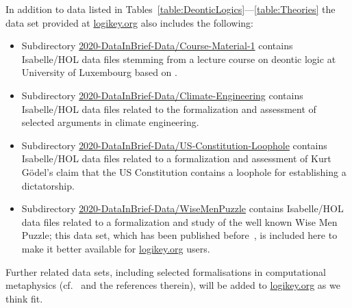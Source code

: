\documentclass{article}
\begin{document}
In addition to data listed in
Tables~\ref{table:DeonticLogics}---\ref{table:Theories} the data set
provided at \url{logikey.org} also includes the following:
\begin{itemize}
\item Subdirectory \url{2020-DataInBrief-Data/Course-Material-1} contains Isabelle/HOL data files stemming from a
  lecture course on deontic logic at University of Luxembourg based on \cite{textbook18}.
\item Subdirectory \url{2020-DataInBrief-Data/Climate-Engineering} contains Isabelle/HOL data files related to the
  formalization and assessment  \cite{C82}  of selected arguments in climate engineering.
\item  Subdirectory \url{2020-DataInBrief-Data/US-Constitution-Loophole} contains Isabelle/HOL data files related to a 
  formalization and assessment  \cite{zahoransky19} of Kurt G\"odel's claim that the US Constitution contains a
  loophole for establishing a dictatorship.
\item  Subdirectory \url{2020-DataInBrief-Data/WiseMenPuzzle} contains Isabelle/HOL data files related to a 
  formalization and study \cite{J41} of the well known Wise Men
  Puzzle; this data set, which has been published before~\cite{J44}, is
  included here to make it better available for 
  \url{logikey.org} users.
\end{itemize}

Further related data sets, including
  selected formalisations in computational metaphysics
  (cf.~\cite{J41,J47} and the references therein), will be added to 
   \url{logikey.org} as we think fit.

\end{document}
